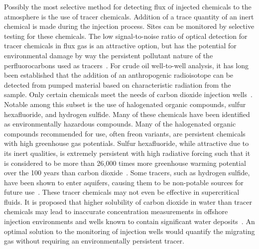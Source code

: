 \documentclass[numbook, envcountsect, envcountsame, envcountreset, runningheads, twocolumn]{svjour3}
\begin{document}
			Possibly the most selective method for detecting flux of injected chemicals to the atmosphere is the use of tracer chemicals.  Addition of a trace quantity of an inert chemical is made during the injection process.  Sites can be monitored by selective testing for these chemicals.  The low signal-to-noise ratio of optical detection for tracer chemicals in flux gas is an attractive option, but has the potential for environmental damage by way the persistent pollutant nature of the perfluorocarbons used as tracers~\cite{wells_atmospheric_2013, wells_use_2007}.  For crude oil well-to-well analysis, it has long been established that the addition of an anthropogenic radioisotope can be detected from pumped material based on characteristic radiation from the sample.  Only certain chemicals meet the needs of carbon dioxide injection wells~\cite{craig_field_1985}.  Notable among this subset is the use of halogenated organic compounds, sulfur hexafluoride, and hydrogen sulfide.  Many of these chemicals have been identified as environmentally hazardous compounds.  Many of the halogenated organic compounds recommended for use, often freon variants, are persistent chemicals with high greenhouse gas potentials.  Sulfur hexafluoride, while attractive due to its inert qualities, is extremely persistent with high radiative forcing such that it is considered to be more than 26,000 times more greenhouse warming potential over the 100 years than carbon dioxide~\cite{myhre_2013:_2013}.  Some tracers, such as hydrogen sulfide, have been shown to enter aquifers, causing them to be non-potable sources for future use~\cite{apps_review_2006}.  These tracer chemicals may not even be effective in supercritical fluids.  It is proposed that higher solubility of carbon dioxide in water than tracer chemicals may lead to inaccurate concentration measurements in offshore injection environments and wells known to contain significant water deposits~\cite{vandeweijer_monitoring_2011}.  An optimal solution to the monitoring of injection wells would quantify the migrating gas without requiring an environmentally persistent tracer.  
			
\end{document}
